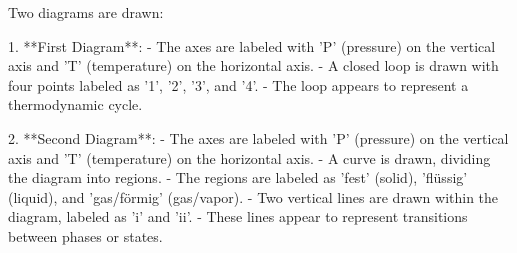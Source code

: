 Two diagrams are drawn:

1. **First Diagram**:  
   - The axes are labeled with 'P' (pressure) on the vertical axis and 'T' (temperature) on the horizontal axis.  
   - A closed loop is drawn with four points labeled as '1', '2', '3', and '4'.  
   - The loop appears to represent a thermodynamic cycle.  

2. **Second Diagram**:  
   - The axes are labeled with 'P' (pressure) on the vertical axis and 'T' (temperature) on the horizontal axis.  
   - A curve is drawn, dividing the diagram into regions.  
   - The regions are labeled as 'fest' (solid), 'flüssig' (liquid), and 'gas/förmig' (gas/vapor).  
   - Two vertical lines are drawn within the diagram, labeled as 'i' and 'ii'.  
   - These lines appear to represent transitions between phases or states.